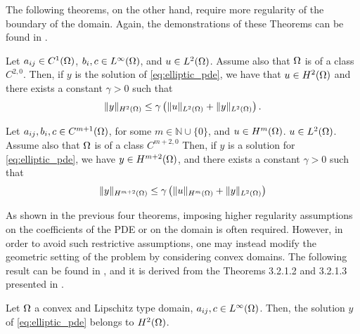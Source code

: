The following theorems, on the other hand, require more regularity of the boundary of the domain. Again, the demonstrations of these Theorems can be found in \cite{evanspde}.

\begin{theorem}
    Let $a_{ij}\in C^{1}(\Omega)$, $b_i, c\in L^{\infty}(\Omega)$, and $u\in L^2(\Omega)$. Assume also that $\Omega$ is of a class $C^{2,0}$. Then, if $y$ is the solution of \eqref{eq:elliptic_pde}, we have that $u\in H^2(\Omega)$ and there exists a constant $\gamma>0$ such that 
    \[
    \lVert y \rVert_{H^2(\Omega)}\le \gamma \left(\lVert u \rVert_{L^2(\Omega)}+\lVert y \rVert_{L^2(\Omega)}\right).
    \]
\end{theorem}

\begin{theorem}
     Let $a_{ij}, b_i, c \in C^{m+1}(\Omega)$, for some $m \in \mathbb{N}\cup \{0\}$, and $u\in H^{m}(\Omega)$. $u\in L^2(\Omega)$. Assume also that $\Omega$ is of a class $C^{m+2,0}$ Then, if $y$ is a solution for \eqref{eq:elliptic_pde}, we have $y\in H^{m+2}(\Omega)$, and there exists a constant $\gamma>0$ such that
    \[
   \lVert y \rVert_{H^{m+2}(\Omega)}\le \gamma\left(\lVert u \rVert_{H^{m}(\Omega)}+\lVert y \rVert_{L^2(\Omega)}\right)
    \]
\end{theorem}

As shown in the previous four theorems, imposing higher regularity assumptions on the coefficients of the PDE or on the domain is often required. However, in order to avoid such restrictive assumptions, one may instead modify the geometric setting of the problem by considering convex domains. The following result can be found in \cite{troeltzsch2010}, and it is derived from the Theorems 3.2.1.2 and 3.2.1.3 presented in \cite{gri85}.

\begin{theorem}
    Let $\Omega$ a convex and Lipschitz type domain, $a_{ij}, c \in L^{\infty}(\Omega)$. Then, the solution $y$ of \eqref{eq:elliptic_pde} belongs to $H^2(\Omega)$. 
\end{theorem}

